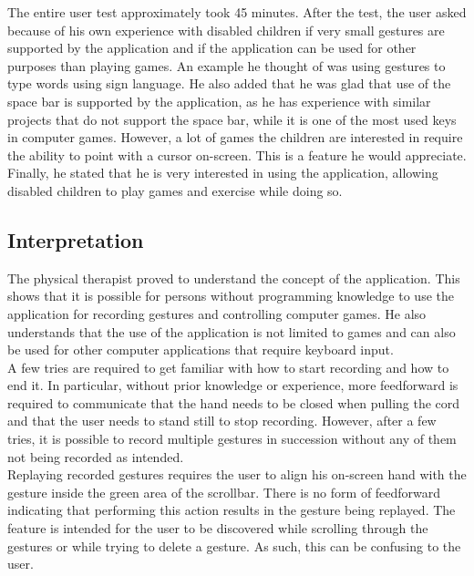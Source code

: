 The entire user test approximately took 45 minutes. After the test, the user asked because of his own experience with disabled children if very small gestures are supported by the application and if the application can be used for other purposes than playing games. An example he thought of was using gestures to type words using sign language. He also added that he was glad that use of the space bar is supported by the application, as he has experience with similar projects that do not support the space bar, while it is one of the most used keys in computer games. However, a lot of games the children are interested in require the ability to point with a cursor on-screen. This is a feature he would appreciate. Finally, he stated that he is very interested in using the application, allowing disabled children to play games and exercise while doing so.


\subsection{Interpretation}

The physical therapist proved to understand the concept of the application. This shows that it is possible for persons without programming knowledge to use the application for recording gestures and controlling computer games. He also understands that the use of the application is not limited to games and can also be used for other computer applications that require keyboard input.\\

A few tries are required to get familiar with how to start recording and how to end it. In particular, without prior knowledge or experience, more feedforward is required to communicate that the hand needs to be closed when pulling the cord and that the user needs to stand still to stop recording. However, after a few tries, it is possible to record multiple gestures in succession without any of them not being recorded as intended.\\

Replaying recorded gestures requires the user to align his on-screen hand with the gesture inside the green area of the scrollbar. There is no form of feedforward indicating that performing this action results in the gesture being replayed. The feature is intended for the user to be discovered while scrolling through the gestures or while trying to delete a gesture. As such, this can be confusing to the user.\\

